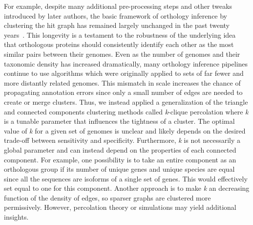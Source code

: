 For example, despite many additional pre-processing steps and other tweaks introduced by later authors, the basic framework of orthology inference by clustering the hit graph has remained largely unchanged in the past twenty years~\cite{Tatusov1997, Remm2001, Li2003, Jensen2007, Linard2011, Emms2015, Train2017, Cosentino2018}. This longevity is a testament to the robustness of the underlying idea that orthologous proteins should consistently identify each other as the most similar pairs between their genomes. Even as the number of genomes and their taxonomic density has increased dramatically, many orthology inference pipelines continue to use algorithms which were originally applied to sets of far fewer and more distantly related genomes. This mismatch in scale increases the chance of propagating annotation errors since only a small number of edges are needed to create or merge clusters. Thus, we instead applied a generalization of the triangle and connected components clustering methods called \textit{k}-clique percolation where \textit{k} is a tunable parameter that influences the tightness of a cluster. The optimal value of \textit{k} for a given set of genomes is unclear and likely depends on the desired trade-off between sensitivity and specificity. Furthermore, \textit{k} is not necessarily a global parameter and can instead depend on the properties of each connected component. For example, one possibility is to take an entire component as an orthologous group if its number of unique genes and unique species are equal since all the sequences are isoforms of a single set of genes. This would effectively set  equal to one for this component. Another approach is to make \textit{k} an decreasing function of the density of edges, so sparser graphs are clustered more permissively. However, percolation theory or simulations may yield additional insights.

